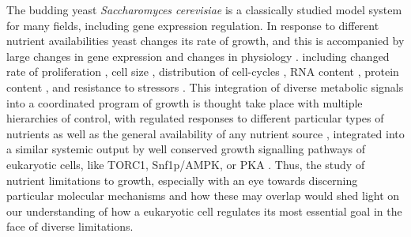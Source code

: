 The budding yeast \textit{Saccharomyces cerevisiae} is a
classically studied model system for many fields, including gene
expression regulation. In response to different nutrient 
availabilities yeast changes its rate of growth, and
this is accompanied by large changes in gene expression 
\parencite{brauer2008coordination,conway2012glucose}
and changes in physiology 
\parencite{waldron1977synthesis,carter1978protein}.
including changed rate of proliferation \parencite{slator1918some}, 
cell size \parencite{}, 
distribution of cell-cycles \parencite{},
RNA content \parencite{waldron1975effect}, 
protein content \parencite{kief1981coordinate},
and resistance to stressors \parencite{}.
This integration of diverse metabolic signals into a coordinated 
program of growth is thought take place with multiple hierarchies of 
control, with regulated responses to different particular 
types of nutrients as well as the general availability of any 
nutrient source 
\parencite{winderickx2003feast,broach2012nutritional,cooper1982nitrogen},
integrated into a similar systemic output by well conserved growth 
signalling pathways of eukaryotic cells, like TORC1, Snf1p/AMPK, 
or PKA \parencite{conrad2014nutrient,thevelein1994signal}.
Thus, the study of nutrient limitations to growth, especially with 
an eye towards discerning particular molecular mechanisms 
\parencite{oliveira2015dynamic,oliveira2015inferring,tate2017general,stracka2014nitrogen,peli2015amino} 
and how these may overlap would shed light on our understanding of
how a eukaryotic cell regulates its most essential goal in the face of
diverse limitations.

